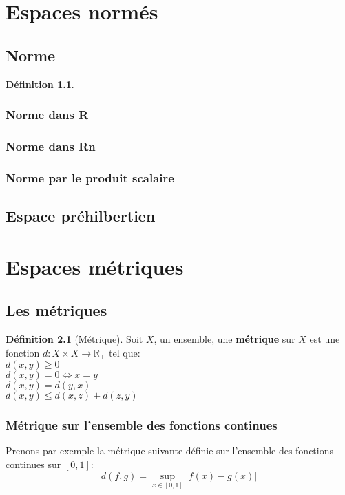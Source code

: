 \documentclass[12pt]{book}
\let\Bbb\mathbb
\theoremstyle{definition}
\newtheorem{definition}{Définition}[section]
\begin{document}
\chapter{Espaces normés}

\section{Norme}
\begin{definition}
    \label{def:norme}
\end{definition}

\subsection{Norme dans R}

\subsection{Norme dans Rn}

\subsection{Norme par le produit scalaire}

\section{Espace préhilbertien}

\chapter{Espaces métriques}
\section{Les métriques}
\begin{definition}[Métrique]
    \label{def:metrique}
    Soit $X$, un ensemble, une \textbf{métrique} sur $X$ est une fonction $d: X \times X \to \Bbb R_+$ tel que: \\
    $d(x, y) \geq 0$ \\
    $d(x, y) = 0 \iff x = y$ \\
    $d(x, y) = d(y, x)$ \\
    $d(x, y) \leq d(x, z) + d(z, y)$ \\
\end{definition}
\subsection{Métrique sur l'ensemble des fonctions continues}
Prenons par exemple la métrique suivante définie sur l'ensemble des fonctions continues sur $[0, 1]$:
$$ d(f, g) = \sup_{x \in [0,1]} |f(x) - g(x)| $$
\end{document}
